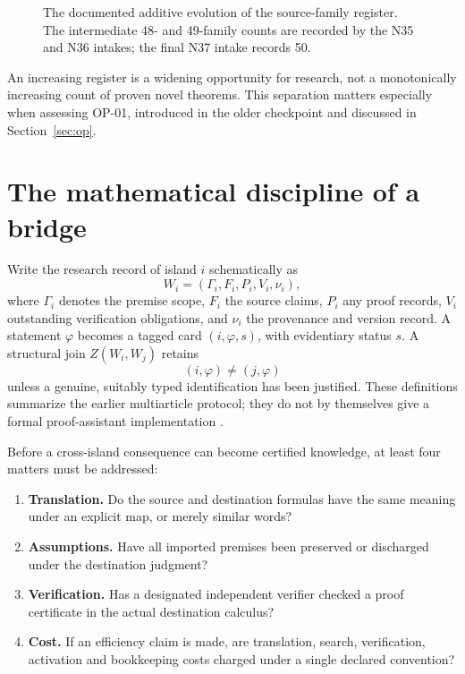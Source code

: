 \documentclass[11pt,letterpaper,oneside]{article}
\begin{document}
\begin{figure}[ht]
\centering
{}
\caption{The documented additive evolution of the source-family register. The intermediate 48- and 49-family counts are recorded by the N35 and N36 intakes; the final N37 intake records 50.}
\end{figure}

An increasing register is a widening opportunity for research, not a monotonically increasing count of proven novel theorems. This separation matters especially when assessing OP-01, introduced in the older checkpoint and discussed in Section~\ref{sec:op}.

\section{The mathematical discipline of a bridge}
Write the research record of island $i$ schematically as
\[
W_i=(\Gamma_i,F_i,P_i,V_i,\nu_i),
\]
where $\Gamma_i$ denotes the premise scope, $F_i$ the source claims, $P_i$ any proof records, $V_i$ outstanding verification obligations, and $\nu_i$ the provenance and version record. A statement $\varphi$ becomes a tagged card $(i,\varphi,s)$, with evidentiary status $s$. A structural join $Z(W_i,W_j)$ retains
\[
(i,\varphi)\neq(j,\varphi)
\]
unless a genuine, suitably typed identification has been justified. These definitions summarize the earlier multiarticle protocol; they do not by themselves give a formal proof-assistant implementation \cite{checkpoint}.

Before a cross-island consequence can become certified knowledge, at least four matters must be addressed:
\begin{enumerate}
\item \textbf{Translation.} Do the source and destination formulas have the same meaning under an explicit map, or merely similar words?
\item \textbf{Assumptions.} Have all imported premises been preserved or discharged under the destination judgment?
\item \textbf{Verification.} Has a designated independent verifier checked a proof certificate in the actual destination calculus?
\item \textbf{Cost.} If an efficiency claim is made, are translation, search, verification, activation and bookkeeping costs charged under a single declared convention?
\end{enumerate}
\end{document}
